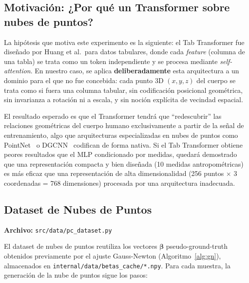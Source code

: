 \documentclass[a4paper,11pt]{article}
\begin{document}
\subsection{Motivación: ¿Por qué un Transformer sobre nubes de puntos?}

La hipótesis que motiva este experimento es la siguiente: el Tab Transformer
fue diseñado por Huang et al.\ para datos tabulares, donde cada
\emph{feature} (columna de una tabla) se trata como un token independiente y
se procesa mediante \emph{self-attention}. En nuestro caso, se aplica
\textbf{deliberadamente} esta arquitectura a un dominio para el que no fue
concebida: cada punto 3D $(x,y,z)$ del cuerpo se trata como si fuera una
columna tabular, sin codificación posicional geométrica, sin invarianza a
rotación ni a escala, y sin noción explícita de vecindad espacial.

El resultado esperado es que el Transformer tendrá que ``redescubrir'' las
relaciones geométricas del cuerpo humano exclusivamente a partir de la
señal de entrenamiento, algo que arquitecturas especializadas en nubes de
puntos como PointNet~\cite{qi2017} o DGCNN~\cite{wang2019} codifican de
forma nativa. Si el Tab Transformer obtiene peores resultados que el MLP
condicionado por medidas, quedará demostrado que una representación compacta
y bien diseñada (10 medidas antropométricas) es más eficaz que una
representación de alta dimensionalidad (256 puntos $\times$ 3 coordenadas
= 768 dimensiones) procesada por una arquitectura inadecuada.

\subsection{Dataset de Nubes de Puntos}

\textbf{Archivo:} \texttt{src/data/pc\_dataset.py}

El dataset de nubes de puntos reutiliza los vectores $\bm{\beta}$
pseudo-ground-truth obtenidos previamente por el ajuste Gauss-Newton
(Algoritmo~\ref{alg:gn}), almacenados en
\texttt{internal/data/betas\_cache/*.npy}. Para cada muestra, la generación
de la nube de puntos sigue los pasos:
\end{document}
